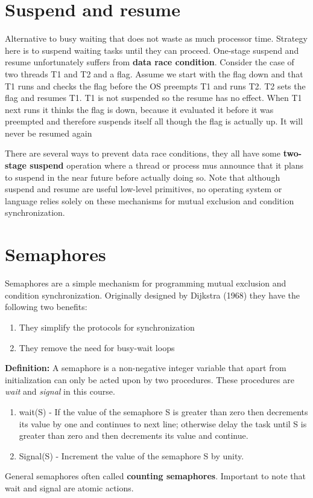 \section{Suspend and resume}
Alternative to busy waiting that does not waste as much processor time. Strategy here is to suspend waiting tasks until they can proceed. One-stage suspend and resume unfortunately suffers from \textbf{data race condition}. Consider the case of two threads T1 and T2 and a flag.  Assume we start with the flag down and that T1 runs and checks the flag before the OS preempts T1 and runs T2. T2 sets the flag and resumes T1. T1 is not suspended so the resume has no effect. When T1 next runs it thinks the flag is down, because it evaluated it before it was preempted and therefore suspends itself all though the flag is actually up. It will never be resumed again

There are several ways to prevent data race conditions, they all have some \textbf{two-stage suspend} operation where a thread or process mus announce that it plans to suspend in the near future before actually doing so. Note that although suspend and resume are useful low-level primitives, no operating system or language relies solely on these mechanisms for mutual exclusion and condition synchronization. 

\section{Semaphores}
Semaphores are a simple mechanism for programming mutual exclusion and condition synchronization. Originally designed by Dijkstra (1968) they have the following two benefits:
\begin{enumerate}
\item They simplify the protocols for synchronization
\item They remove the need for busy-wait loops
\end{enumerate}
\textbf{Definition:} A semaphore is a non-negative integer variable that apart from initialization can only be acted upon by two procedures. These procedures are \textit{wait} and \textit{signal} in this course.
\begin{enumerate}
\item wait(S) - If the value of the semaphore S is greater than zero then decrements its value by one and continues to next line; otherwise delay the task until S is greater than zero and then decrements its value and continue.
\item Signal(S) - Increment the value of the semaphore S by unity.
\end{enumerate}
General semaphores often called \textbf{counting semaphores}. Important to note that wait and signal are atomic actions.

